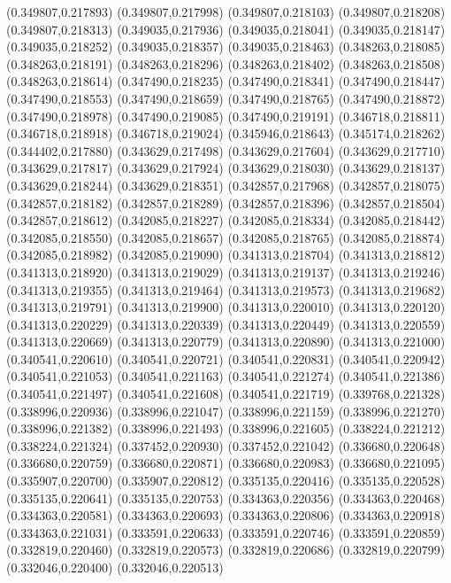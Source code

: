 (0.349807,0.217893)
(0.349807,0.217998)
(0.349807,0.218103)
(0.349807,0.218208)
(0.349807,0.218313)
(0.349035,0.217936)
(0.349035,0.218041)
(0.349035,0.218147)
(0.349035,0.218252)
(0.349035,0.218357)
(0.349035,0.218463)
(0.348263,0.218085)
(0.348263,0.218191)
(0.348263,0.218296)
(0.348263,0.218402)
(0.348263,0.218508)
(0.348263,0.218614)
(0.347490,0.218235)
(0.347490,0.218341)
(0.347490,0.218447)
(0.347490,0.218553)
(0.347490,0.218659)
(0.347490,0.218765)
(0.347490,0.218872)
(0.347490,0.218978)
(0.347490,0.219085)
(0.347490,0.219191)
(0.346718,0.218811)
(0.346718,0.218918)
(0.346718,0.219024)
(0.345946,0.218643)
(0.345174,0.218262)
(0.344402,0.217880)
(0.343629,0.217498)
(0.343629,0.217604)
(0.343629,0.217710)
(0.343629,0.217817)
(0.343629,0.217924)
(0.343629,0.218030)
(0.343629,0.218137)
(0.343629,0.218244)
(0.343629,0.218351)
(0.342857,0.217968)
(0.342857,0.218075)
(0.342857,0.218182)
(0.342857,0.218289)
(0.342857,0.218396)
(0.342857,0.218504)
(0.342857,0.218612)
(0.342085,0.218227)
(0.342085,0.218334)
(0.342085,0.218442)
(0.342085,0.218550)
(0.342085,0.218657)
(0.342085,0.218765)
(0.342085,0.218874)
(0.342085,0.218982)
(0.342085,0.219090)
(0.341313,0.218704)
(0.341313,0.218812)
(0.341313,0.218920)
(0.341313,0.219029)
(0.341313,0.219137)
(0.341313,0.219246)
(0.341313,0.219355)
(0.341313,0.219464)
(0.341313,0.219573)
(0.341313,0.219682)
(0.341313,0.219791)
(0.341313,0.219900)
(0.341313,0.220010)
(0.341313,0.220120)
(0.341313,0.220229)
(0.341313,0.220339)
(0.341313,0.220449)
(0.341313,0.220559)
(0.341313,0.220669)
(0.341313,0.220779)
(0.341313,0.220890)
(0.341313,0.221000)
(0.340541,0.220610)
(0.340541,0.220721)
(0.340541,0.220831)
(0.340541,0.220942)
(0.340541,0.221053)
(0.340541,0.221163)
(0.340541,0.221274)
(0.340541,0.221386)
(0.340541,0.221497)
(0.340541,0.221608)
(0.340541,0.221719)
(0.339768,0.221328)
(0.338996,0.220936)
(0.338996,0.221047)
(0.338996,0.221159)
(0.338996,0.221270)
(0.338996,0.221382)
(0.338996,0.221493)
(0.338996,0.221605)
(0.338224,0.221212)
(0.338224,0.221324)
(0.337452,0.220930)
(0.337452,0.221042)
(0.336680,0.220648)
(0.336680,0.220759)
(0.336680,0.220871)
(0.336680,0.220983)
(0.336680,0.221095)
(0.335907,0.220700)
(0.335907,0.220812)
(0.335135,0.220416)
(0.335135,0.220528)
(0.335135,0.220641)
(0.335135,0.220753)
(0.334363,0.220356)
(0.334363,0.220468)
(0.334363,0.220581)
(0.334363,0.220693)
(0.334363,0.220806)
(0.334363,0.220918)
(0.334363,0.221031)
(0.333591,0.220633)
(0.333591,0.220746)
(0.333591,0.220859)
(0.332819,0.220460)
(0.332819,0.220573)
(0.332819,0.220686)
(0.332819,0.220799)
(0.332046,0.220400)
(0.332046,0.220513)
